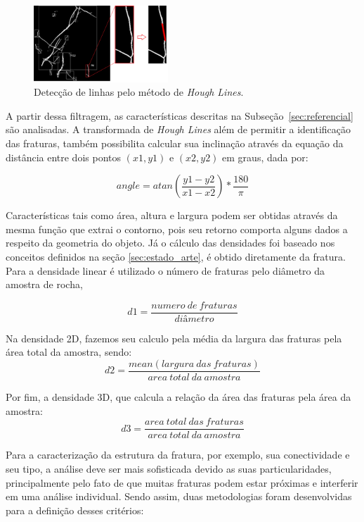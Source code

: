 \documentclass[a4paper,10pt,twocolumn,twoside]{article}
\begin{document}
\begin{figure}[!htb]
\centering
\includegraphics[width=0.45\textwidth]{Figuras/hough_lines.png}
\caption{Detecção de linhas pelo método de \textit{Hough Lines}.}
\label{fig:houglines}
\end{figure}

A partir dessa filtragem, as características descritas na Subseção~\ref{sec:referencial} são analisadas. A transformada de \textit{Hough Lines} além de permitir a identificação das fraturas, também possibilita calcular sua inclinação através da equação da distância entre dois pontos $(x1,y1)$ e $(x2,y2)$ em graus, dada por:

\begin{equation}
   angle = atan(\frac{y1-y2}{x1-x2}) * \frac{180}{\pi }
\end{equation}


Características tais como área, altura e largura podem ser obtidas através da mesma função que extrai o contorno, pois seu retorno comporta alguns dados a respeito da geometria do objeto. Já o cálculo das densidades foi baseado nos conceitos definidos na seção \ref{sec:estado_arte}, é obtido diretamente da fratura. Para a densidade linear é utilizado o número de fraturas pelo diâmetro da amostra de rocha,

\begin{equation}
    d1= \frac{numero\ de\ fraturas}{diâmetro}
\end{equation}

Na densidade 2D, fazemos seu calculo pela média da largura das fraturas pela área total da amostra, sendo:
\begin{equation}
    d2 = \frac{mean(largura\ das\ fraturas)}{area\ total\ da\ amostra}
\end{equation}

Por fim, a densidade 3D, que calcula a relação da área das fraturas pela área da amostra:
\begin{equation}
    d3= \frac{area\ total\ das\ fraturas}{area\ total\ da\ amostra}
\end{equation}


Para a caracterização da estrutura da fratura, por exemplo, sua conectividade e seu tipo, a análise deve ser mais sofisticada devido as suas particularidades, principalmente pelo fato de que muitas fraturas podem estar próximas e interferir em uma análise individual. Sendo assim, duas metodologias foram desenvolvidas para a definição desses critérios:
\end{document}
